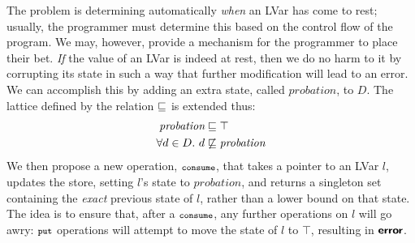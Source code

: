 The problem is determining automatically {\em when} an LVar has come to rest;
usually, the programmer must determine this based on the control flow of the
program.  We may, however, provide a mechanism for the programmer to place their bet.
{\em If} the value
of an LVar is indeed at rest, then we do no harm to it by
corrupting its state in such a way that further modification will lead to an
error.  We can accomplish this by adding an extra state, called
$\textit{probation}$, to $D$.  The lattice defined by the relation
$\sqsubseteq$ is extended thus:
%
\begin{align*}
\textit{probation} &\sqsubseteq \top \\
\forall d \in D.~d &\not\sqsubseteq \textit{probation}
\end{align*}
\noindent
We then propose a new operation, $\mbox{\footnotesize \texttt{consume}}$, that takes a pointer to an LVar $l$, updates the store, setting $l$'s state to $\textit{probation}$, and returns a singleton
  set containing the {\em exact} previous state of $l$, rather than a lower bound on that state.
The idea is to ensure that, after a $\mbox{\footnotesize \texttt{consume}}$, any further operations 
on $l$ will go awry:
$\mbox{\footnotesize \texttt{put}}$ operations will
attempt to move the state of $l$ to $\top$, 
resulting in $\textbf{\textsf{error}}$.







